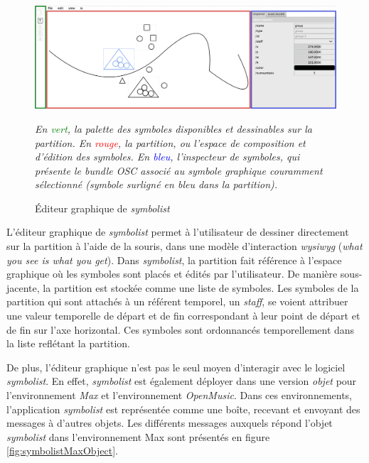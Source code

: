 \begin{figure}[H]
	\centering
	\includegraphics[keepaspectratio=true, width=\textwidth]{SymbolistOutilDeRecherche/i/symbolistUIBefore.png}
	\caption{Éditeur graphique de \textit{symbolist}}
	\label{fig:symbolistUIBefore}
	\small
	\it
	En \textcolor{green}{vert}, la palette des symboles disponibles et dessinables sur la partition. En \textcolor{red}{rouge}, la partition, ou l'espace de composition et d'édition des symboles. En \textcolor{blue}{bleu}, l'inspecteur de symboles, qui présente le bundle OSC associé au symbole graphique couramment sélectionné (symbole surligné en bleu dans la partition).
\end{figure}

L'éditeur graphique de \textit{symbolist} permet à l'utilisateur de dessiner directement sur la partition à l'aide de la souris, dans une modèle d'interaction \textit{wysiwyg} (\textit{what you see is what you get}). Dans \textit{symbolist}, la partition fait référence à l'espace graphique où les symboles sont placés et édités par l'utilisateur. De manière sous-jacente, la partition est stockée comme une liste de symboles. Les symboles de la partition qui sont attachés à un référent temporel, un \textit{staff}, se voient attribuer une valeur temporelle de départ et de fin correspondant à leur point de départ et de fin sur l'axe horizontal. Ces symboles sont ordonnancés temporellement dans la liste reflétant la partition.

De plus, l'éditeur graphique n'est pas le seul moyen d'interagir avec le logiciel \textit{symbolist}. En effet, \textit{symbolist} est également déployer dans une version \textit{objet} pour l'environnement \textit{Max} et l'environnement \textit{OpenMusic}. Dans ces environnements, l'application \textit{symbolist} est représentée comme une boîte, recevant et envoyant des messages à d'autres objets. Les différents messages auxquels répond l'objet \textit{symbolist} dans l'environnement Max sont présentés en figure \ref{fig:symbolistMaxObject}.

